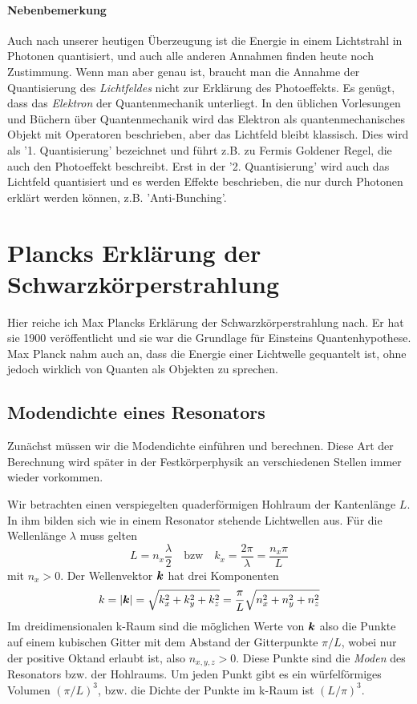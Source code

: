  \paragraph*{Nebenbemerkung} Auch nach unserer heutigen Überzeugung ist die Energie in einem Lichtstrahl in Photonen quantisiert, und auch alle anderen Annahmen finden heute noch Zustimmung. Wenn man aber genau ist, braucht man die Annahme der Quantisierung des \emph{Lichtfeldes} nicht zur Erklärung des Photoeffekts. Es genügt, dass das \emph{Elektron} der Quantenmechanik unterliegt. In den üblichen Vorlesungen und Büchern über Quantenmechanik wird das Elektron als quantenmechanisches Objekt mit Operatoren beschrieben, aber das Lichtfeld bleibt klassisch. Dies wird als '1. Quantisierung' bezeichnet und führt z.B. zu Fermis Goldener Regel, die auch den Photoeffekt beschreibt.
 Erst in der '2. Quantisierung' wird auch das Lichtfeld quantisiert und es werden Effekte beschrieben, die nur durch Photonen erklärt werden können, z.B. 'Anti-Bunching'.


 \section{Plancks Erklärung der Schwarzkörperstrahlung}

Hier reiche ich Max Plancks Erklärung der Schwarzkörperstrahlung nach. Er hat sie 1900 veröffentlicht und sie war die Grundlage für Einsteins Quantenhypothese. Max Planck nahm auch an, dass die Energie einer Lichtwelle gequantelt ist, ohne jedoch wirklich von Quanten als Objekten zu sprechen.

\subsection{Modendichte eines Resonators}

Zunächst müssen wir die Modendichte einführen und berechnen. Diese Art der Berechnung wird später in der Festkörperphysik an verschiedenen Stellen immer wieder vorkommen.




Wir betrachten einen verspiegelten quaderförmigen Hohlraum der Kantenlänge $L$. In ihm bilden sich wie in einem Resonator stehende Lichtwellen aus. Für die Wellenlänge $\lambda$ muss gelten
\begin{equation}
     L = n_x \frac{\lambda}{2} \quad \text{bzw} \quad k_x = \frac{2 \pi}{\lambda} = \frac{n_x \pi }{L}
\end{equation}
mit $n_x > 0$. Der Wellenvektor $\boldsymbol{k}$ hat drei Komponenten
\begin{equation}
    k = | \boldsymbol{k} | = \sqrt{k_x^2 + k_y^2 + k_z^2 } = \frac{\pi}{L} \sqrt{n_x^2 + n_y^2 + n_z^2}
\end{equation}
Im dreidimensionalen k-Raum sind die möglichen Werte von $\boldsymbol{k}$ also die Punkte auf einem kubischen Gitter mit dem Abstand der Gitterpunkte $\pi / L$, wobei nur der positive Oktand erlaubt ist, also $n_{x,y,z} > 0$. Diese Punkte sind die \emph{Moden} des Resonators bzw. der Hohlraums. Um jeden Punkt gibt es ein würfelförmiges Volumen $(\pi/L)^3$, bzw. die Dichte der Punkte im k-Raum ist $(L/\pi)^3$.

